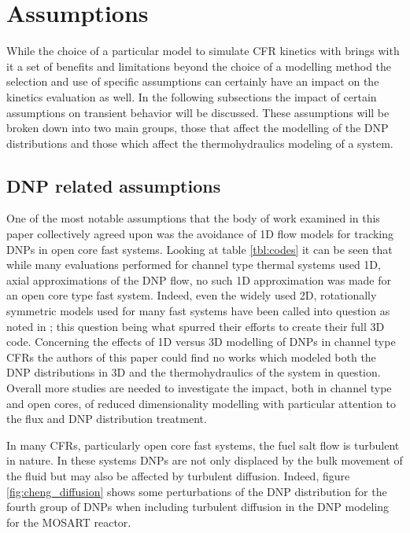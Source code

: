 \documentclass[review]{elsarticle}
\begin{document}
\section{Assumptions} \label{sec:asm}
While the choice of a particular model to simulate CFR kinetics with brings
with it a set of benefits and limitations beyond the choice of a modelling
method the selection and use of specific assumptions can certainly have an
impact on the kinetics evaluation as well. In the following subsections the
impact of certain assumptions on transient behavior will be discussed. These
assumptions will be broken down into two main groups, those that affect the
modelling of the DNP distributions and those which affect the thermohydraulics
modeling of a system.

\subsection{DNP related assumptions} \label{ssec:dnp_asm}
One of the most notable assumptions
that the body of work examined in this paper collectively agreed upon was the
avoidance of 1D flow models for tracking DNPs in open core fast systems. Looking
at table \ref{tbl:codes} it can be seen that while many evaluations performed
for channel type thermal systems used 1D, axial approximations of the DNP
flow, no such 1D approximation was made for an open core type fast system.
Indeed, even the widely used 2D, rotationally symmetric models used for many
fast systems have been called into question as noted in
\cite{aufiero_development_2014}; this question being what spurred their efforts
to create their full 3D code. Concerning the effects of 1D versus 3D modelling
of DNPs in channel type CFRs the authors of this paper could find no works
which modeled both the DNP distributions in 3D and the thermohydraulics of
the system in question. Overall more studies are needed to investigate the
impact, both in channel type and open cores, of reduced dimensionality
modelling with particular attention to the flux and DNP distribution treatment.
\par In many CFRs, particularly open core fast systems, the fuel salt flow is
turbulent in nature. In these systems DNPs are not only displaced by the
bulk movement of the fluid but may also be affected by turbulent diffusion.
Indeed, figure \ref{fig:cheng_diffusion} shows some perturbations of the DNP
distribution for the fourth group of DNPs when including turbulent diffusion
in the DNP modeling for the MOSART reactor.
\end{document}
